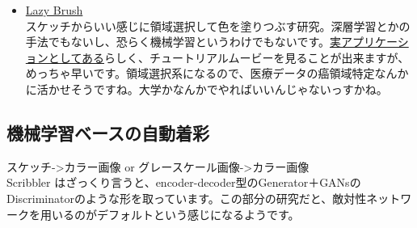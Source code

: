 \documentclass[a4paper, dvipdfmx, 10pt]{article}
\begin{document}
\begin{itemize}
\item \href{https://dcgi.fel.cvut.cz/home/sykorad/Sykora09-EG.pdf}{Lazy Brush}\\

スケッチからいい感じに領域選択して色を塗りつぶす研究。深層学習とかの手法でもないし、恐らく機械学習というわけでもないです。\href{http://animatetvp.blogspot.com/2015/01/lazybrush.html}{実アプリケーションとしてある}らしく、チュートリアルムービーを見ることが出来ますが、めっちゃ早いです。領域選択系になるので、医療データの癌領域特定なんかに活かせそうですね。大学かなんかでやればいいんじゃないっすかね。\\
\end{itemize}

\subsection{機械学習ベースの自動着彩}
\label{sec:orge934f22}
スケッチ->カラー画像 or グレースケール画像->カラー画像\\
Scribbler はざっくり言うと、encoder-decoder型のGenerator＋GANsのDiscriminatorのような形を取っています。この部分の研究だと、敵対性ネットワークを用いるのがデフォルトという感じになるようです。\\
\end{document}
